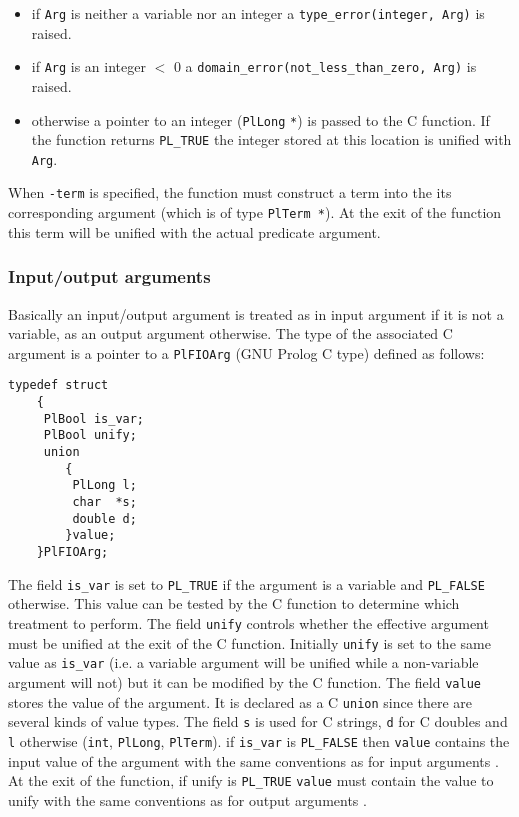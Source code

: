 \begin{itemize}

\item if \texttt{Arg} is neither a variable nor an integer a
\texttt{type\_error(integer, Arg)} is raised.

\item if \texttt{Arg} is an integer $<$ 0 a
\texttt{domain\_error(not\_less\_than\_zero, Arg)} is raised.

\item otherwise a pointer to an integer (\texttt{PlLong} \texttt{*}) is passed
to the C function. If the function returns \texttt{PL\_TRUE} the integer stored
at this location is unified with \texttt{Arg}.

\end{itemize}

When \texttt{-term} is specified, the function must construct a term into
the its corresponding argument (which is of type \texttt{PlTerm *}). At the
exit of the function this term will be unified with the actual predicate
argument.

\subsubsection{Input/output arguments}
\label{Input/output-arguments}
Basically an input/output argument is treated as in input argument if it is
not a variable, as an output argument otherwise. The type of the associated
C argument is a pointer to a \texttt{PlFIOArg} (GNU Prolog C type) defined as
follows:

\begin{Indentation}
\begin{verbatim}
typedef struct
    {
     PlBool is_var;
     PlBool unify;
     union
        {
         PlLong l;
         char  *s;
         double d;
        }value;
    }PlFIOArg;
\end{verbatim}
\end{Indentation}

The field \texttt{is\_var} is set to \texttt{PL\_TRUE} if the argument is a
variable and \texttt{PL\_FALSE} otherwise. This value can be tested by the C
function to determine which treatment to perform. The field \texttt{unify}
controls whether the effective argument must be unified at the exit of the C
function. Initially \texttt{unify} is set to the same value as
\texttt{is\_var} (i.e. a variable argument will be unified while a
non-variable argument will not) but it can be modified by the C function.
The field \texttt{value} stores the value of the argument. It is declared as
a C \texttt{union} since there are several kinds of value types. The field
\texttt{s} is used for C strings, \texttt{d} for C doubles and \texttt{l}
otherwise (\texttt{int}, \texttt{PlLong}, \texttt{PlTerm}). if \texttt{is\_var}
is \texttt{PL\_FALSE} then \texttt{value} contains the input value of the
argument with the same conventions as for input arguments
.  At the exit of the function, if unify is
\texttt{PL\_TRUE} \texttt{value} must contain the value to unify with the same
conventions as for output arguments
.

